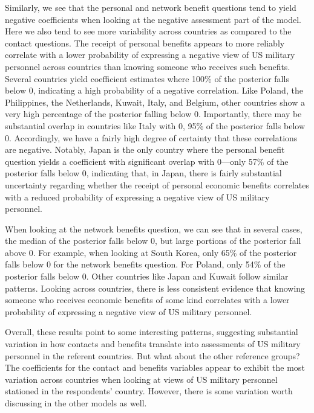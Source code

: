 Similarly, we see that the personal and network benefit questions tend to yield negative coefficients when looking at the negative assessment part of the model. Here we also tend to see more variability across countries as compared to the contact questions. The receipt of personal benefits appears to more reliably correlate with a lower probability of expressing a negative view of US military personnel across countries than knowing someone who receives such benefits. Several countries yield coefficient estimates where 100\% of the posterior falls below 0, indicating a high probability of a negative correlation. Like Poland, the Philippines, the Netherlands, Kuwait, Italy, and Belgium, other countries show a very high percentage of the posterior falling below 0. Importantly, there may be substantial overlap in countries like Italy with 0, 95\% of the posterior falls below 0. Accordingly, we have a fairly high degree of certainty that these correlations are negative. Notably, Japan is the only country where the personal benefit question yields a coefficient with significant overlap with 0---only 57\% of the posterior falls below 0, indicating that, in Japan, there is fairly substantial uncertainty regarding whether the receipt of personal economic benefits correlates with a reduced probability of expressing a negative view of US military personnel. 

When looking at the network benefits question, we can see that in several cases, the median of the posterior falls below 0, but large portions of the posterior fall above 0. For example, when looking at South Korea, only 65\% of the posterior falls below 0 for the network benefits question. For Poland, only 54\% of the posterior falls below 0. Other countries like Japan and Kuwait follow similar patterns. Looking across countries, there is less consistent evidence that knowing someone who receives economic benefits of some kind correlates with a lower probability of expressing a negative view of US military personnel.

Overall, these results point to some interesting patterns, suggesting substantial variation in how contacts and benefits translate into assessments of US military personnel in the referent countries. But what about the other reference groups? The coefficients for the contact and benefits variables appear to exhibit the most variation across countries when looking at views of US military personnel stationed in the respondents' country. However, there is some variation worth discussing in the other models as well. 

